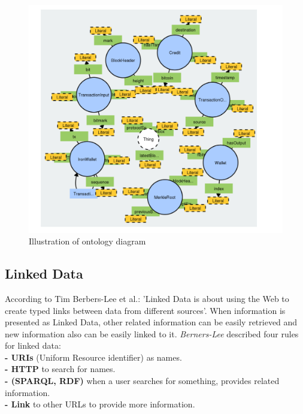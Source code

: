 \begin{center}
	
	
	\begin{figure}[htb!]
		
		\begin{minipage}{0.55\linewidth}
			\centering
			\includegraphics[width=1.65\textwidth]{images/chap02_diagram_ontology.png}
		\end{minipage}
		\caption[Illustration of ontology diagram]{Illustration of ontology diagram\cite{Matthew}}
		
		
	\end{figure}
	
\end{center}

\subsection{Linked Data}
According to Tim Berbers-Lee et al.\cite{Tim}: 'Linked Data is about using the Web to create typed links between data
from different sources'. When information
is presented as Linked Data, other related information can be easily retrieved and new information also can be easily linked to it. \textit{Berners-Lee} described four rules for linked data:\\
\textbf{- URIs} (Uniform Resource identifier) as names.\\ 
\textbf{- HTTP} to search for names.\\
\textbf{- (SPARQL, RDF)}  when a user searches for something, provides related information.\\
\textbf{- Link} to other URLs to provide more information\cite{Hector}.\\

